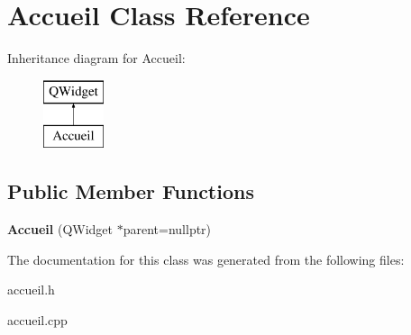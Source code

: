\hypertarget{class_accueil}{}\section{Accueil Class Reference}
\label{class_accueil}
Inheritance diagram for Accueil\+:\begin{figure}[H]
\begin{center}
\leavevmode
\includegraphics[height=2.000000cm]{class_accueil}
\end{center}
\end{figure}
\subsection*{Public Member Functions}
\begin{DoxyCompactItemize}
\item 
\mbox{\label{class_accueil_a77c09f454c594d7889abe0fea916192b}} 
{\bfseries Accueil} (Q\+Widget $\ast$parent=nullptr)
\end{DoxyCompactItemize}


The documentation for this class was generated from the following files\+:\begin{DoxyCompactItemize}
\item 
accueil.\+h\item 
accueil.\+cpp\end{DoxyCompactItemize}
